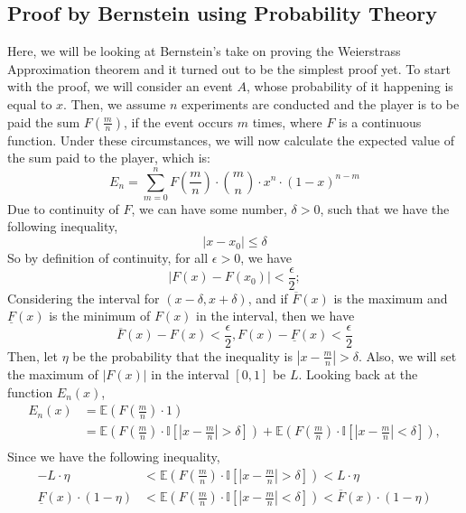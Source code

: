 \documentclass{article}
\begin{document}
\subsection{Proof by Bernstein using Probability Theory}\label{subsec:pbb}
Here, we will be looking at Bernstein's take on proving the Weierstrass Approximation theorem and it turned out to be the simplest proof yet.
To start with the proof, we will consider an event $A$, whose probability of it happening is equal to $x$. 
Then, we assume $n$ experiments are conducted and the player is to be paid the sum $F(\frac{m}{n})$, if the event occurs $m$ times, where $F$ is a continuous function.\cite{bertrand15}
Under these circumstances, we will now calculate the expected value of the sum paid to the player, which is:
\begin{equation*}
    E_n = \sum_{m=0}^{n}F\left(\frac{m}{n}\right)\cdot{m\choose n}\cdot x^n\cdot(1-x)^{n-m}
\end{equation*}
Due to continuity of $F$, we can have some number, $\delta>0$, such that we have the following inequality,
\begin{equation*}
|x-x_0|\leq\delta
\end{equation*}
So by definition of continuity, for all $\epsilon>0$, we have
\begin{equation*}
    |F(x)-F(x_0)|<\frac{\epsilon}{2};
\end{equation*}
Considering the interval for $(x-\delta,x+\delta)$, and if $\overline{F}(x)$ is the maximum and $\underline{F}(x)$ is the minimum of $F(x)$ in the interval, then we have
\begin{equation}\label{eqn:eps}
    \overline{F}(x)-F(x)<\frac{\epsilon}{2}, F(x)-\underline{F}(x)<\frac{\epsilon}{2}
\end{equation}
Then, let $\eta$ be the probability that the inequality is $|x-\frac{m}{n}|>\delta$.
Also, we will set the maximum of $|F(x)|$ in the interval $[0,1]$ be $L$.
Looking back at the function $E_n(x)$,
\begin{align*}
    E_n(x) &= \mathbb{E}\left(F\left(\frac{m}{n}\right)\cdot1\right) \\
    &= \mathbb{E}\left(F\left(\frac{m}{n}\right)\cdot \mathbb{I}\left[|x-\frac{m}{n}|>\delta\right]\right) + \mathbb{E}\left(F\left(\frac{m}{n}\right)\cdot \mathbb{I}\left[|x-\frac{m}{n}|<\delta\right]\right),\\
\end{align*}
Since we have the following inequality,
\begin{align*}
    -L\cdot\eta&<\mathbb{E}\left(F\left(\frac{m}{n}\right)\cdot \mathbb{I}\left[|x-\frac{m}{n}|>\delta\right]\right)<L\cdot\eta\\
    \underline{F}(x)\cdot(1-\eta)&<\mathbb{E}\left(F\left(\frac{m}{n}\right)\cdot \mathbb{I}\left[|x-\frac{m}{n}|<\delta\right]\right)<\overline{F}(x)\cdot (1-\eta)
\end{align*}
\end{document}
